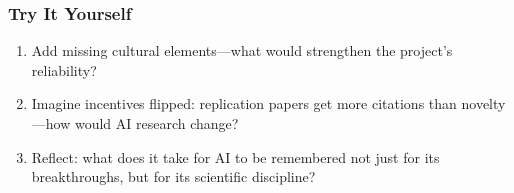 \documentclass[
  letterpaper,
  DIV=11,
  numbers=noendperiod]{scrreprt}
\providecommand{\tightlist}{%
  \setlength{\itemsep}{0pt}\setlength{\parskip}{0pt}}
\begin{document}
\subsubsection{Try It Yourself}\label{try-it-yourself-99}

\begin{enumerate}
\def\labelenumi{\arabic{enumi}.}
\tightlist
\item
  Add missing cultural elements---what would strengthen the project's
  reliability?
\item
  Imagine incentives flipped: replication papers get more citations than
  novelty---how would AI research change?
\item
  Reflect: what does it take for AI to be remembered not just for its
  breakthroughs, but for its scientific discipline?
\end{enumerate}
\end{document}
